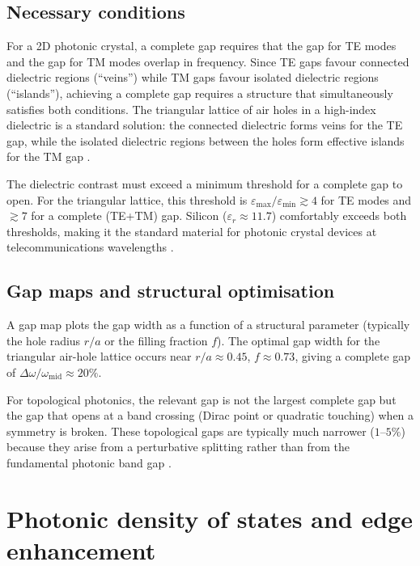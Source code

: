 \subsection{Necessary conditions}
\label{sec:ch4-gap-necessary}

For a 2D photonic crystal, a complete gap requires that the gap
for TE modes and the gap for TM modes overlap in frequency.  Since
TE gaps favour connected dielectric regions (``veins'') while TM gaps
favour isolated dielectric regions (``islands''), achieving a complete
gap requires a structure that simultaneously satisfies both
conditions.  The triangular lattice of air holes in a high-index
dielectric is a standard solution: the connected dielectric forms
veins for the TE gap, while the isolated dielectric regions between
the holes form effective islands for the TM gap
\cite{ozawa2018topological,haldane2008possible}.

The dielectric contrast must exceed a minimum threshold for a complete
gap to open.  For the triangular lattice, this threshold is
$\varepsilon_{\mathrm{max}}/\varepsilon_{\mathrm{min}}\gtrsim 4$ for
TE modes and $\gtrsim 7$ for a complete (TE+TM) gap.  Silicon
($\varepsilon_r\approx 11.7$) comfortably exceeds both thresholds,
making it the standard material for photonic crystal devices at
telecommunications wavelengths \cite{price2022roadmap}.

\subsection{Gap maps and structural optimisation}
\label{sec:ch4-gap-maps}

A gap map plots the gap width as a function of a structural parameter
(typically the hole radius $r/a$ or the filling fraction $f$).  The
optimal gap width for the triangular air-hole lattice occurs near
$r/a\approx 0.45$, $f\approx 0.73$, giving a complete gap of
$\Delta\omega/\omega_{\mathrm{mid}}\approx 20\%$.

For topological photonics, the relevant gap is not the largest
complete gap but the gap that opens at a band crossing (Dirac point or
quadratic touching) when a symmetry is broken.  These topological gaps
are typically much narrower ($1$--$5\%$) because they arise from a
perturbative splitting rather than from the fundamental photonic band
gap \cite{asbth2016berry,ozawa2018topological}.

\section{Photonic density of states and edge enhancement}
\label{sec:ch4-dos-van-hove}

